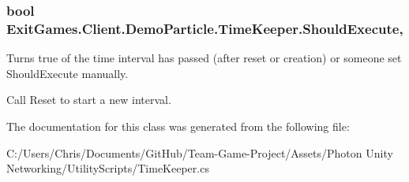 \subsubsection[{\texorpdfstring{Should\+Execute}{ShouldExecute}}]{\setlength{\rightskip}{0pt plus 5cm}bool Exit\+Games.\+Client.\+Demo\+Particle.\+Time\+Keeper.\+Should\+Execute\hspace{0.3cm}{\ttfamily [get]}, {\ttfamily [set]}}\hypertarget{class_exit_games_1_1_client_1_1_demo_particle_1_1_time_keeper_aa448c3addb4ded8b0226be09bed5982c}{}\label{class_exit_games_1_1_client_1_1_demo_particle_1_1_time_keeper_aa448c3addb4ded8b0226be09bed5982c}


Turns true of the time interval has passed (after reset or creation) or someone set Should\+Execute manually. 

Call Reset to start a new interval.

The documentation for this class was generated from the following file\+:\begin{DoxyCompactItemize}
\item 
C\+:/\+Users/\+Chris/\+Documents/\+Git\+Hub/\+Team-\/\+Game-\/\+Project/\+Assets/\+Photon Unity Networking/\+Utility\+Scripts/Time\+Keeper.\+cs\end{DoxyCompactItemize}
